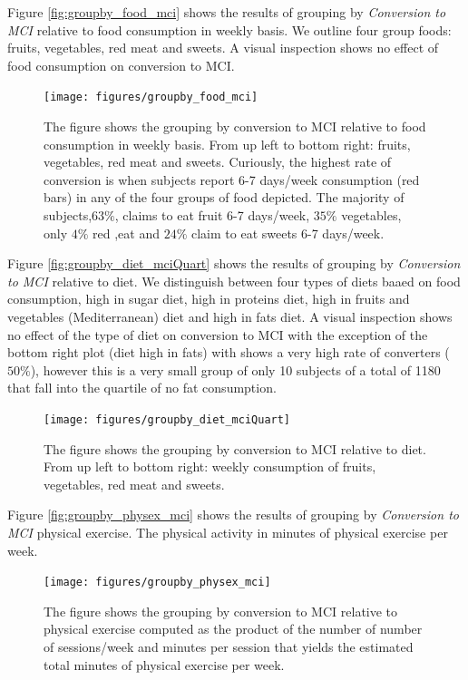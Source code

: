 \documentclass[11pt]{article}
\theoremstyle{definition}
\theoremstyle{remark}
\begin{document}
Figure \ref{fig:groupby_food_mci} shows the results of grouping by \emph{Conversion to MCI} relative to food consumption in weekly basis. We outline four group foods: fruits, vegetables, red meat and sweets. A visual inspection shows no effect of food consumption on conversion to MCI. %

\begin{figure}[H]
        \centering
        \texttt{[image: figures/groupby\_food\_mci]}
        \caption{The figure shows the grouping by conversion to MCI relative to food consumption in weekly basis. From up left to bottom right: fruits, vegetables, red meat and sweets.  Curiously, the highest rate of conversion is when subjects report 6-7 days/week consumption (red bars) in any of the four groups of food depicted. The majority of subjects,$63\%$, claims to eat fruit 6-7 days/week, $35\%$ vegetables, only $4\%$ red ,eat and $24\%$ claim to eat sweets 6-7 days/week.} 
        \label{fig:groupby_sleep_mci}
\end{figure}

Figure \ref{fig:groupby_diet_mciQuart} shows the results of grouping by \emph{Conversion to MCI} relative to diet. We distinguish between four types of diets baaed on food consumption, high in sugar diet, high in proteins diet, high in fruits and vegetables (Mediterranean) diet and high in fats diet. A visual inspection shows no effect of the type of diet on conversion to MCI with the exception of the bottom right plot (diet high in fats) with shows a very high rate of converters ($50\%$), however this is a very small group of only 10 subjects of a total of 1180 that fall into the quartile of no fat consumption. 
\begin{figure}[H]
        \centering
        \texttt{[image: figures/groupby\_diet\_mciQuart]}
        \caption{The figure shows the grouping by conversion to MCI relative to diet. From up left to bottom right: weekly consumption of fruits, vegetables, red meat and sweets.} 
        \label{fig:groupby_sleep_mci}
\end{figure}

Figure \ref{fig:groupby_physex_mci} shows the results of grouping by \emph{Conversion to MCI} physical exercise. The physical activity in minutes of physical exercise per week. %

\begin{figure}[H]
        \centering
        \texttt{[image: figures/groupby\_physex\_mci]}
        \caption{The figure shows the grouping by conversion to MCI relative to physical exercise computed as the product of the number of number of sessions/week and minutes per session that yields the estimated total minutes of physical exercise per week.} 
        \label{fig:groupby_sleep_mci}
\end{figure}
\end{document}
